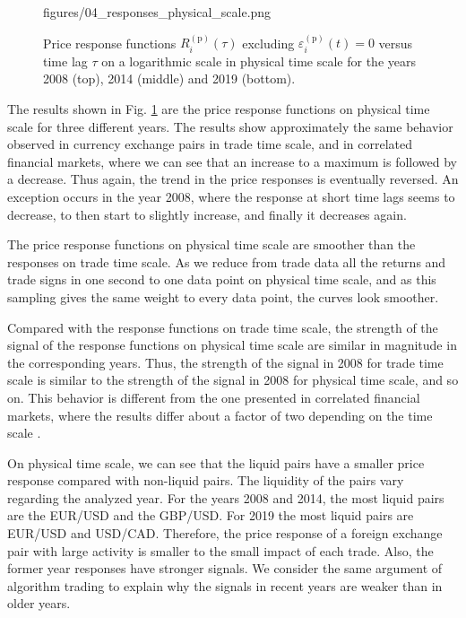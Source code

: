 \begin{figure}[htbp]
    {figures/04_responses_physical_scale.png}
    \caption{Price response functions
             $R^{\left(\textrm{p}\right)}_{i}\left(\tau\right)$ excluding
             $\varepsilon^{\left(\textrm{p}\right)}_{i}\left(t\right) = 0$ versus time
             lag $\tau$ on a logarithmic scale in physical time scale for the
             years 2008 (top), 2014 (middle) and 2019 (bottom).}
    \label{fig:response_function_physical_scale}
\end{figure}
The results shown in Fig. \ref{fig:response_function_physical_scale} are the
price response functions on physical time scale for three different years. The
results show approximately the same behavior observed in currency exchange
pairs in trade time scale, and in correlated financial markets, where we can
see that an increase to a maximum is followed by a decrease. Thus again, the
trend in the price responses is eventually reversed. An exception occurs in the
year 2008, where the response at short time lags seems to decrease, to then
start to slightly increase, and finally it decreases again.

The price response functions on physical time scale are smoother than the
responses on trade time scale. As we reduce from trade data all the returns and
trade signs in one second to one data point on physical time scale, and as this
sampling gives the same weight to every data point, the curves look smoother.

Compared with the response functions on trade time scale, the strength of the
signal of the response functions on physical time scale are similar in
magnitude in the corresponding years. Thus, the strength of the signal in 2008
for trade time scale is similar to the strength of the signal in 2008 for
physical time scale, and so on. This behavior is different from the one
presented in correlated financial markets, where the results differ about a
factor of two depending on the time scale \cite{my_paper_response_financial}.

On physical time scale, we can see that the liquid pairs have a smaller price
response compared with non-liquid pairs. The liquidity of the pairs vary
regarding the analyzed year. For the years 2008 and 2014, the most liquid pairs
are the EUR/USD and the GBP/USD. For 2019 the most liquid pairs are EUR/USD and
USD/CAD. Therefore, the price response of a foreign exchange pair with large
activity is smaller to the small impact of each trade. Also, the former year
responses have stronger signals. We consider the same argument of algorithm
trading to explain why the signals in recent years are weaker than in older years.
